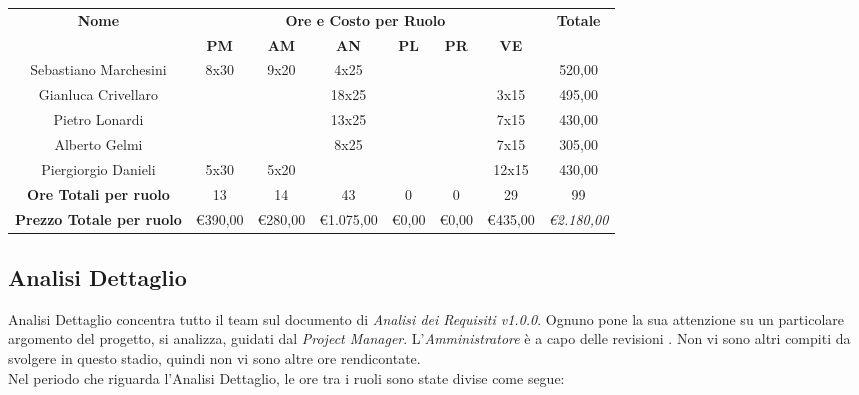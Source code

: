 \documentclass[12pt,a4paper,titlepage]{article}
\begin{document}
	{\renewcommand\arraystretch{1.2} %
		\small
		\begin{tabular}{|c|c|c|c|c|c|c|c|}
			\hline 
			\textbf{Nome} & \multicolumn{6}{c|}{\textbf{Ore e Costo per Ruolo}} & \textbf{Totale} \\ 
			& \textbf{PM} & \textbf{AM} & \textbf{AN} & \textbf{PL} & \textbf{PR} & \textbf{VE} & \textbf{} \\ 
			\hline
			Sebastiano Marchesini & 8x30 & 9x20 & 4x25 & & & & 520,00 \\ 
			\hline 
			Gianluca Crivellaro & & & 18x25 & & & 3x15 & 495,00 \\ 
			\hline 
			Pietro Lonardi & & & 13x25 & & & 7x15 & 430,00 \\ 
			\hline 
			Alberto Gelmi & & & 8x25 & & & 7x15 & 305,00 \\ 
			\hline 
			Piergiorgio Danieli & 5x30 & 5x20 & & & & 12x15 & 430,00 \\ 
			\hline
			\textbf{Ore Totali per ruolo} & 13 & 14 & 43 & 0 & 0 & 29 & 99 \\  
			\textbf{Prezzo Totale per ruolo}&\euro 390,00&\euro 280,00&\euro  1.075,00&\euro 0,00&\euro 0,00&\euro 435,00& \textit{\euro 2.180,00} \\
			\hline  
	\end{tabular}} 
	
	\subsection{Analisi Dettaglio}
	Analisi Dettaglio concentra tutto il team sul documento di \textit{Analisi dei Requisiti v1.0.0}. Ognuno pone la sua attenzione su un particolare argomento del progetto, si analizza, guidati dal \textit{Project Manager}. L'\textit{Amministratore} è a capo delle revisioni . Non vi sono altri compiti da svolgere in questo stadio, quindi non vi sono altre ore rendicontate.\\
	Nel periodo che riguarda l'Analisi Dettaglio, le ore tra i ruoli sono state divise come segue:\\
	
\end{document}
